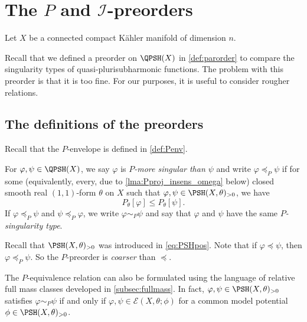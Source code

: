 \section{The \texorpdfstring{$P$}{P} and \texorpdfstring{$\mathcal{I}$}{I}-preorders}\label{sec:PIpartialorder}
Let $X$ be a connected compact Kähler manifold of dimension $n$.


Recall that we defined a preorder on $\QPSH(X)$ in \cref{def:parorder} to compare the singularity types of quasi-plurisubharmonic functions. The problem with this preorder is that it is too fine. For our purposes, it is useful to consider rougher relations.

\subsection{The definitions of the preorders}
\label{subsec:preorder_def}

Recall that the $P$-envelope is defined in \cref{def:Penv}.
\begin{definition}\label{def:Pmoresing}
    For $\varphi,\psi\in \QPSH(X)$, we say $\varphi$ is \emph{$P$-more singular than $\psi$} and write $\varphi\preceq_P \psi$ if for some (equivalently, every, due to \cref{lma:Pproj_insens_omega} below) closed smooth real $(1,1)$-form $\theta$ on $X$ such that $\varphi,\psi\in \PSH(X,\theta)_{>0}$, we have
        \begin{equation}\label{eq:Penvleq}
        P_{\theta}[\varphi]\leq P_{\theta}[\psi].
        \end{equation}
    If $\varphi\preceq_P \psi$ and $\psi \preceq_P \varphi$, we write $\varphi\sim_P \psi$ and say that $\varphi$ and $\psi$ have the same \emph{$P$-singularity type}.
\end{definition}
Recall that $\PSH(X,\theta)_{>0}$ was introduced in \eqref{eq:PSHpos}.
Note that if $\varphi\preceq \psi$, then $\varphi\preceq_P \psi$. So the $P$-preorder is \emph{coarser} than $\preceq$.

The $P$-equivalence relation can also be formulated using the language of relative full mass classes developed in \cref{subsec:fullmass}.
In fact, $\varphi,\psi\in \PSH(X,\theta)_{>0}$ satisfies $\varphi\sim_P \psi$ if and only if $\varphi,\psi \in \mathcal{E}(X,\theta;\phi)$ for a common model potential $\phi\in \PSH(X,\theta)_{>0}$.


